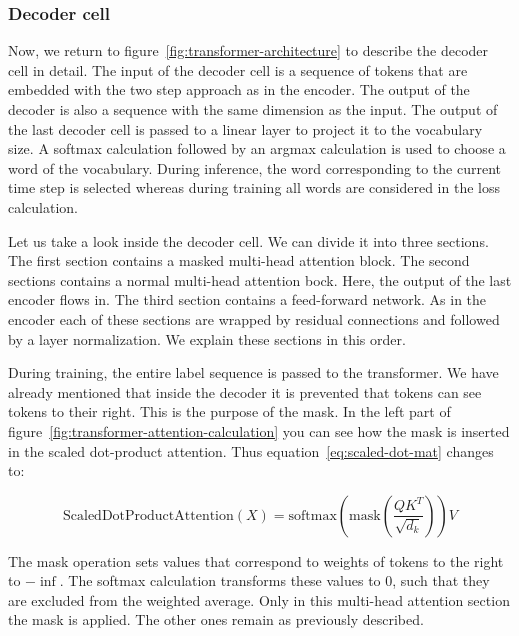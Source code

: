 \documentclass[a4paper]{scrartcl}
\begin{document}
    \subsubsection{Decoder cell}
    Now, we return to figure~\ref{fig:transformer-architecture} to describe the decoder cell in detail.
    The input of the decoder cell is a sequence of tokens that are embedded with the two step approach as in the encoder.
    The output of the decoder is also a sequence with the same dimension as the input.
    The output of the last decoder cell is passed to a linear layer to project it to the vocabulary size.
    A softmax calculation followed by an argmax calculation is used to choose a word of the vocabulary.
    During inference, the word corresponding to the current time step is selected whereas during training all words are considered in the loss calculation.

    Let us take a look inside the decoder cell.
    We can divide it into three sections.
    The first section contains a masked multi-head attention block.
    The second sections contains a normal multi-head attention bock.
    Here, the output of the last encoder flows in.
    The third section contains a feed-forward network.
    As in the encoder each of these sections are wrapped by residual connections and followed by a layer normalization.
    We explain these sections in this order.

    During training, the entire label sequence is passed to the transformer.
    We have already mentioned that inside the decoder it is prevented that tokens can see tokens to their right.
    This is the purpose of the mask.
    In the left part of figure~\ref{fig:transformer-attention-calculation} you can see how the mask is inserted in the scaled dot-product attention.
    Thus equation~\ref{eq:scaled-dot-mat} changes to:

    \begin{equation}
        \text{ScaledDotProductAttention}(X) = \text{softmax}(\text{mask}(\frac{QK^T}{\sqrt {d_k}}))V\label{eq:scaled-dot-mask}
    \end{equation}

    The mask operation sets values that correspond to weights of tokens to the right to $- \inf$.
    The softmax calculation transforms these values to $0$, such that they are excluded from the weighted average.
    Only in this multi-head attention section the mask is applied.
    The other ones remain as previously described.
\end{document}
